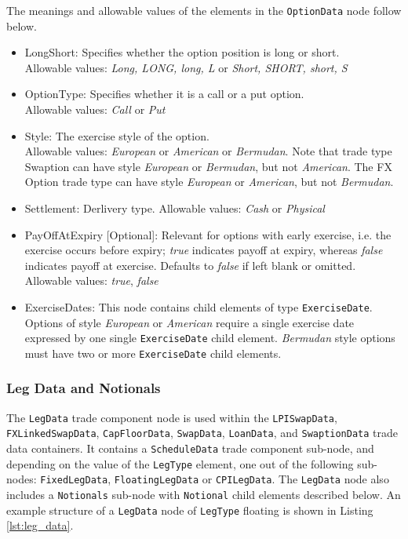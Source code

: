 The meanings and allowable values of the elements in the \lstinline!OptionData! node follow below.

\begin{itemize}
\item LongShort: Specifies whether the option position is long  or short.  \\Allowable values: \emph{Long, LONG, long, L} or \emph{Short, SHORT, short, S}
\item OptionType: Specifies whether it is a call or a put option. \\Allowable values: \emph{Call} or \emph{Put} 
\item Style: The exercise style of the option. \\Allowable values: \emph{European} or \emph{American} or \emph{Bermudan}. Note that trade type Swaption can have style  \emph{European} or  \emph{Bermudan}, but not \emph{American}. The FX Option trade type can have style \emph{European} or \emph{American}, but not \emph{Bermudan}.
\item Settlement: Derlivery type. Allowable values: \emph{Cash} or \emph{Physical} 
\item PayOffAtExpiry [Optional]: Relevant for options with early exercise, i.e. the exercise occurs before expiry; \emph{true}  indicates payoff at expiry, whereas \emph{false}  indicates payoff at exercise. Defaults to \emph{false}  if left blank or omitted. \\Allowable values: \emph{true}, \emph{false}
\item ExerciseDates: This node contains child elements of type \lstinline!ExerciseDate!.  Options of style \emph{European} or \emph{American} require a single exercise date expressed by one single \lstinline!ExerciseDate! child element.  \emph{Bermudan} style options must have two or more \lstinline!ExerciseDate! child elements.


\end{itemize}



\subsubsection{Leg Data and Notionals}
\label{ss:leg_data}

The \lstinline!LegData! trade component node is used within the \lstinline!LPISwapData!, \lstinline!FXLinkedSwapData!, \lstinline!CapFloorData!,  \lstinline!SwapData!, \lstinline!LoanData!, and \lstinline!SwaptionData! trade data containers. It contains a \lstinline!ScheduleData! trade component sub-node, and depending on the value of the \lstinline!LegType! element, one out of the following sub-nodes:  \lstinline!FixedLegData!, \lstinline!FloatingLegData! or \lstinline!CPILegData!. The \lstinline!LegData! node also includes a \lstinline!Notionals! sub-node  with \lstinline!Notional! child elements described below. An example structure of a \lstinline!LegData! node of \lstinline!LegType! floating is shown in Listing \ref{lst:leg_data}.

